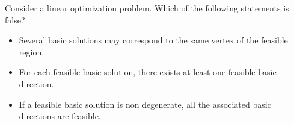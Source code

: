 Consider a linear optimization problem. Which of the following statements is false?

\begin{itemize}
\item[(a)] {Several basic solutions may correspond to the same vertex of the feasible region.}
\item[(b)] {For each feasible basic solution, there exists at least one feasible basic direction.}
\item[(c)] {If a feasible basic solution is non degenerate, all the associated basic directions are feasible.}
\end{itemize}
